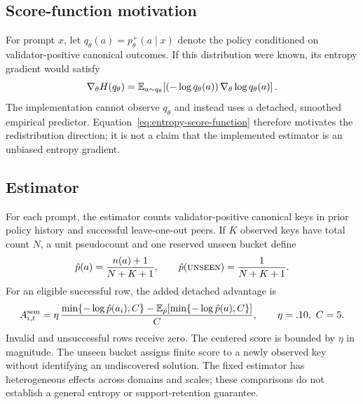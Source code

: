 \subsection{Score-function motivation}
\label{app:semantic-score}

For prompt $x$, let $q_\theta(a)=p_\theta^+(a\mid x)$ denote the policy
conditioned on validator-positive canonical outcomes. If this distribution
were known, its entropy gradient would satisfy
\begin{equation}
  \nabla_\theta H(q_\theta)
  =\mathbb E_{a\sim q_\theta}\!\left[
    (-\log q_\theta(a))\,\nabla_\theta\log q_\theta(a)
  \right].
  \label{eq:entropy-score-function}
\end{equation}
The implementation cannot observe $q_\theta$ and instead uses a detached,
smoothed empirical predictor. Equation~\ref{eq:entropy-score-function}
therefore motivates the redistribution direction; it is not a claim that the
implemented estimator is an unbiased entropy gradient.

\subsection{Estimator}
\label{app:legacy-semantic-estimator}
\label{app:semantic-estimator}

For each prompt, the estimator counts validator-positive canonical keys in
prior policy history and successful leave-one-out peers. If $K$ observed keys
have total count $N$, a unit pseudocount and one reserved unseen bucket define
\begin{equation}
  \hat p(a)=\frac{n(a)+1}{N+K+1},\qquad
  \hat p(\textsc{unseen})=\frac{1}{N+K+1}.
  \label{eq:open-set-predictor}
\end{equation}
For an eligible successful row, the added detached advantage is
\begin{equation}
  A^{\mathrm{sem}}_{i,t}
  =\eta\,\frac{\min\{-\log\hat p(a_i),C\}
    -\mathbb E_{\hat p}[\min\{-\log\hat p(a),C\}]}{C},
  \qquad \eta=.10,\ C=5.
  \label{eq:legacy-semantic-advantage}
\end{equation}
Invalid and unsuccessful rows receive zero. The centered score is bounded by
$\eta$ in magnitude. The unseen bucket assigns finite score to a newly observed
key without identifying an undiscovered solution. The fixed estimator has
heterogeneous effects across domains and scales; these comparisons do not
establish a general entropy or support-retention guarantee.

